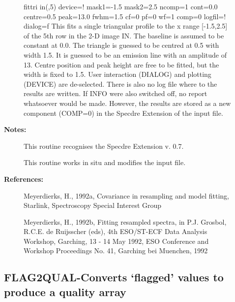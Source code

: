 \begin{description}
\begin{description}
\begin{terminalv}
fittri in(,5) device=! mask1=-1.5 mask2=2.5
      ncomp=1 cont=0.0 centre=0.5 peak=13.0 fwhm=1.5 cf=0 pf=0 wf=1
      comp=0 logfil=! dialog=f
   This fits a single triangular profile to the x range [-1.5,2.5]
   of the 5th row in the 2-D image IN. The baseline is assumed to
   be constant at 0.0. The triangle is guessed to be centred at
   0.5 with width 1.5. It is guessed to be an emission line with
   an amplitude of 13. Centre position and peak height are free to
   be fitted, but the width is fixed to 1.5. User interaction
   (DIALOG) and plotting (DEVICE) are de-selected. There is also no
   log file where to the results are written. If INFO were also
   switched off, no report whatsoever would be made. However, the
   results are stored as a new component (COMP=0) in the Specdre
   Extension of the input file.
\end{terminalv}

\item [\textbf{Notes:}]
This routine recognises the Specdre Extension v. 0.7.

This routine works in situ and modifies the input file.

\item [\textbf{References:}]
   Meyerdierks, H., 1992a, Covariance in resampling and model fitting,
   Starlink, Spectroscopy Special Interest Group

   Meyerdierks, H., 1992b, Fitting resampled spectra, in P.J.
   Grosbol, R.C.E. de Ruijsscher (eds), 4th ESO/ST-ECF Data Analysis
   Workshop, Garching, 13 - 14 May 1992, ESO Conference and Workshop
   Proceedings No. 41, Garching bei Muenchen, 1992
\end{description}
\subsection{FLAG2QUAL-\label{FLAG2QUAL}Converts `flagged' values to produce a quality array}
\begin{description}


\end{description}
\end{description}
